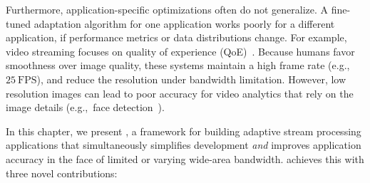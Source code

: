 Furthermore, application-specific optimizations often do not generalize. A
fine-tuned adaptation algorithm for one application works poorly for a different
application, if performance metrics or data distributions change.  For example,
video streaming focuses on quality of experience
(QoE)~\cite{michalos2012dynamic, pantos2016http, yin2015control}. Because humans
favor smoothness over image quality, these systems maintain a high frame rate
(e.g.,~\(25~\text{FPS}\)), and reduce the resolution under bandwidth limitation.
However, low resolution images can lead to poor accuracy for video analytics
that rely on the image details (e.g.,~face detection~\cite{viola2001rapid}).

In this chapter, we present \awstream{}, a framework for building adaptive stream
processing applications that simultaneously simplifies development \emph{and}
improves application accuracy in the face of limited or varying wide-area
bandwidth.
\awstream{} achieves this with three novel contributions:

